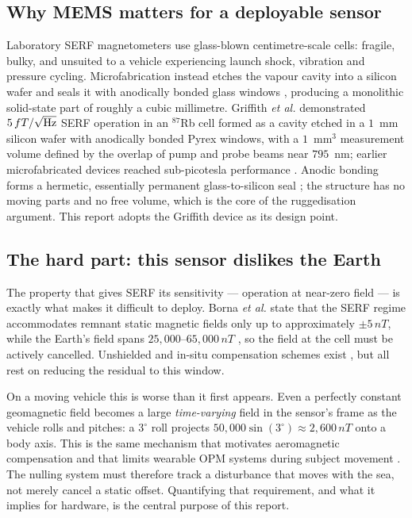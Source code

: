 \documentclass[11pt]{article}
\newcommand{\nT}{\,nT}\newcommand{\pT}{\,pT}\newcommand{\fT}{\,fT}
\begin{document}
\subsection{Why MEMS matters for a deployable sensor}
Laboratory SERF magnetometers use glass-blown centimetre-scale cells: fragile,
bulky, and unsuited to a vehicle experiencing launch shock, vibration and
pressure cycling. Microfabrication instead etches the vapour cavity into a
silicon wafer and seals it with anodically bonded glass windows
\cite{liew2004,schwindt2004}, producing a monolithic solid-state part of roughly
a cubic millimetre. Griffith \emph{et al.} \cite{griffith2010} demonstrated
$5\fT/\sqrt{\rm Hz}$ SERF operation in an $^{87}$Rb cell formed as a cavity
etched in a $1$~mm silicon wafer with anodically bonded Pyrex windows, with a
$1$~mm$^3$ measurement volume defined by the overlap of pump and probe beams near
$795$~nm; earlier microfabricated devices reached sub-picotesla performance
\cite{shah2007}. Anodic bonding forms a hermetic, essentially permanent
glass-to-silicon seal \cite{liew2004}; the structure has no moving parts and no
free volume, which is the core of the ruggedisation argument. This report adopts
the Griffith device as its design point.

\subsection{The hard part: this sensor dislikes the Earth}
The property that gives SERF its sensitivity --- operation at near-zero field
\cite{allred2002} --- is exactly what makes it difficult to deploy. Borna
\emph{et al.} \cite{borna2022} state that the SERF regime accommodates remnant
static magnetic fields only up to approximately $\pm5\nT$, while the Earth's field
spans $25{,}000$--$65{,}000\nT$ \cite{ncei}, so the field at the cell must be
actively cancelled. Unshielded and in-situ compensation schemes exist
\cite{seltzer2004,fang2012}, but all rest on reducing the residual to this window.

On a moving vehicle this is worse than it first appears. Even a perfectly constant
geomagnetic field becomes a large \emph{time-varying} field in the sensor's frame
as the vehicle rolls and pitches: a $3^{\circ}$ roll projects
$50{,}000\sin(3^{\circ})\approx2{,}600\nT$ onto a body axis. This is the same
mechanism that motivates aeromagnetic compensation \cite{tolles1950,gnadt2022}
and that limits wearable OPM systems during subject movement
\cite{boto2018,borna2022b}. The nulling system must therefore track a disturbance
that moves with the sea, not merely cancel a static offset. Quantifying that
requirement, and what it implies for hardware, is the central purpose of this
report.
\end{document}

